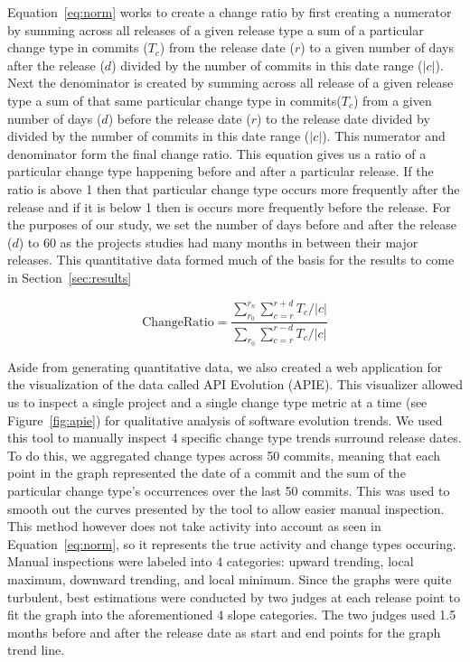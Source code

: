 \documentclass[conference]{IEEEtran}
\begin{document}
Equation~\ref{eq:norm} works to create a change ratio by first creating a numerator by summing across all releases of
a given release type a sum of a particular change type in commits ($T_c$)
from the release date ($r$) to a given number of days after the release ($d$) divided by the number of commits in this date range ($|c|$). Next the denominator
is created by summing across all release of a given release type
a sum of that same particular change type in commits($T_c$) from a given number of days ($d$) before the release date ($r$) to
the release date divided by divided by the number of commits in this date range ($|c|$). This numerator and denominator form the final change ratio.
This equation gives us a ratio of a particular change type happening before and after a particular release. If the ratio is above 1 then that particular change
type occurs more frequently after the release and if it is below 1 then is occurs more frequently before the release. For the purposes of our study, we set the
number of days before and after the release ($d$) to 60 as the projects studies had many months in between their major releases. This quantitative data
formed much of the basis for the results to come in Section~\ref{sec:results}

\begin{equation}
\text{ChangeRatio} = \frac{ \sum_{r_0}^{r_n}\sum_{c=r}^{r+d} T_c / |c|} { \sum_{r_0}\sum_{c=r}^{r-d} T_c / |c|}
\label{eq:norm}
\end{equation}

Aside from generating quantitative data, we also created a web application for the visualization of the data called API Evolution (APIE). This visualizer allowed
us to inspect a single project and a single change type metric at a time (see Figure~\ref{fig:apie}) for qualitative analysis of software evolution trends. We
used this tool to manually inspect 4 specific change type trends surround release dates. To do this, we aggregated change types across 50 commits, meaning that
each point in the graph represented the date of a commit and the sum of the particular change type's occurrences over the last 50 commits. This was used to smooth
out the curves presented by the tool to allow easier manual inspection. This method however does not take activity into account as seen in
Equation~\ref{eq:norm}, so it represents the true activity and change types occuring. Manual inspections were labeled into 4 categories: upward trending, local maximum, downward
trending, and local minimum. Since the graphs were quite turbulent, best estimations were conducted by two judges at each release point to fit the graph into the aforementioned
4 slope categories. The two judges used 1.5 months before and after the release date as start and end points for the graph trend line.
\end{document}
